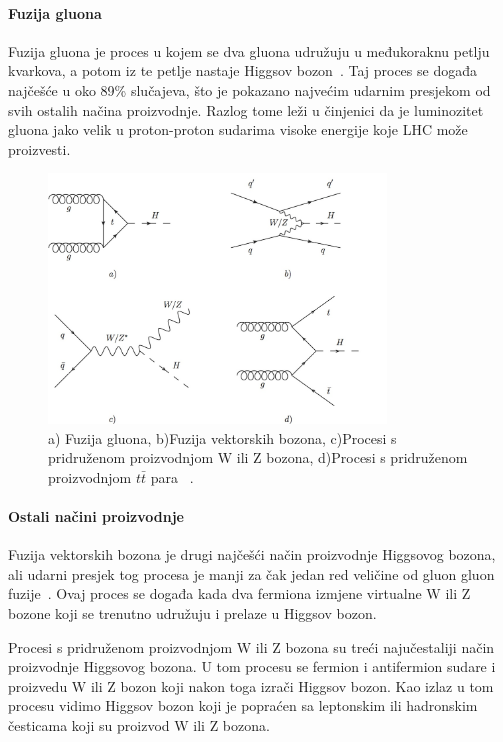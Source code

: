 \documentclass[12pt,a4paper,oneside]{article}
\begin{document}
\begin{linenumbers}
		\paragraph{Fuzija gluona\newline}
		Fuzija gluona je proces u kojem se dva gluona udružuju u međukoraknu petlju kvarkova, a potom iz te petlje nastaje Higgsov bozon~\cite{doktorat}. Taj proces se događa najčešće u oko 89\% slučajeva, što je pokazano najvećim udarnim presjekom od svih ostalih načina proizvodnje. Razlog tome leži u činjenici da je luminozitet gluona jako velik u proton-proton sudarima visoke energije koje LHC može proizvesti.
		\begin{figure}[H]
			\centering
			\includegraphics[width=0.8\textwidth]{higgs-production.jpg}
			\caption[Saturn viđen u  svjetlu.]{\label{sl:gluon-fuzija}a) Fuzija gluona, b)Fuzija vektorskih bozona, c)Procesi s pridruženom proizvodnjom W ili Z bozona, d)Procesi s pridruženom proizvodnjom \begin{math}
				t \bar{t}
				\end{math}  para  ~\cite{doktorat}. }
		\end{figure}
		
		\paragraph{Ostali načini proizvodnje\newline}
		Fuzija vektorskih bozona je drugi najčešći način proizvodnje Higgsovog bozona, ali udarni presjek tog procesa je manji za čak jedan red veličine od gluon gluon fuzije~\cite{doktorat}. Ovaj proces se događa kada dva fermiona izmjene virtualne W ili Z bozone koji se trenutno udružuju i prelaze u Higgsov bozon.
	
		Procesi s pridruženom proizvodnjom W ili Z bozona su treći najučestaliji način proizvodnje Higgsovog bozona. U tom procesu se fermion i antifermion sudare i proizvedu W ili Z bozon koji nakon toga izrači Higgsov bozon. Kao izlaz u tom procesu vidimo Higgsov bozon koji je popraćen sa leptonskim ili hadronskim česticama koji su proizvod  W ili Z bozona.
		

\end{linenumbers}
\end{document}
